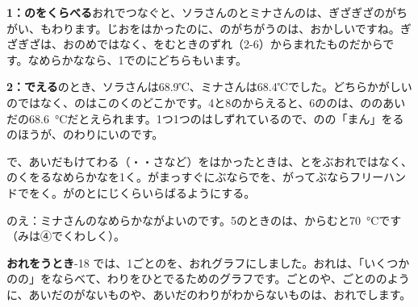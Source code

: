 \textbf{1：のをくらべる}\quad おれでつなぐと、ソラさんのとミナさんのは、ぎざぎざのがちがい、もわります。じおをはかったのに、のがちがうのは、おかしいですね。ぎざぎざは、おのめではなく、をむときのずれ（2-6）からまれたものだからです。なめらかななら、1でのにどちらもいます。

\textbf{2：でえる}のとき、ソラさんは68.9℃、ミナさんは68.4℃でした。どちらかがしいのではなく、のはこのくのどこかです。4と8のからえると、6ののは、ののあいだの\qty{68.6}{\degreeCelsius}だとえられます。1つ1つのはしずれているので、のの「まん」をるのほうが、のわりにいのです。

\begin{taisetsu}
で、あいだもけてわる（・・さなど）をはかったときは、とをぶおれではなく、のくをるなめらかなを1く。がまっすぐにぶならでを、がってぶならフリーハンドでをく。がのとにじくらいらばるようにする。
\end{taisetsu}

\bkhatenaref のえ：ミナさんのなめらかながよいのです。5のときのは、からむと\qty{70}{\degreeCelsius}です（みは④でくわしく）。

\textbf{おれをうとき}-18 では、1ごとのを、おれグラフにしました。おれは、「いくつかのの」をならべて、わりをひとでるためのグラフです。ごとのや、ごとののように、あいだのがないものや、あいだのわりがわからないものは、おれでします。

